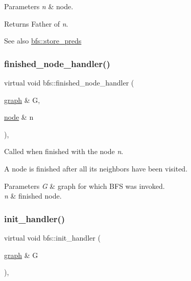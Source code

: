 \begin{DoxyParams}{Parameters}
{\em n} & node. \\
\hline
\end{DoxyParams}
\begin{DoxyReturn}{Returns}
Father of {\itshape n}. 
\end{DoxyReturn}
\begin{DoxySeeAlso}{See also}
\mbox{\hyperlink{classbfs_a8c7ce0ea2cd8e1932d1da5693d90cf61}{bfs\+::store\+\_\+preds}} 
\end{DoxySeeAlso}
\mbox{\label{classbfs_adb6604080f3376e9713e35cd9d7d8943}} 
\subsubsection{\texorpdfstring{finished\+\_\+node\+\_\+handler()}{finished\_node\_handler()}}
{\footnotesize\ttfamily virtual void bfs\+::finished\+\_\+node\+\_\+handler (\begin{DoxyParamCaption}\item[{\mbox{\hyperlink{classgraph}{graph}} \&}]{G,  }\item[{\mbox{\hyperlink{classnode}{node}} \&}]{n }\end{DoxyParamCaption})\hspace{0.3cm}{\ttfamily [inline]}, {\ttfamily [virtual]}}



Called when finished with the node {\itshape n}. 

A node is finished after all its neighbors have been visited.


\begin{DoxyParams}{Parameters}
{\em G} & graph for which B\+FS was invoked. \\
\hline
{\em n} & finished node. \\
\hline
\end{DoxyParams}
\mbox{\label{classbfs_ab9af608a9b2d570a8688498bc3c53d7f}} 
\subsubsection{\texorpdfstring{init\+\_\+handler()}{init\_handler()}}
{\footnotesize\ttfamily virtual void bfs\+::init\+\_\+handler (\begin{DoxyParamCaption}\item[{\mbox{\hyperlink{classgraph}{graph}} \&}]{G }\end{DoxyParamCaption})\hspace{0.3cm}{\ttfamily [inline]}, {\ttfamily [virtual]}}



